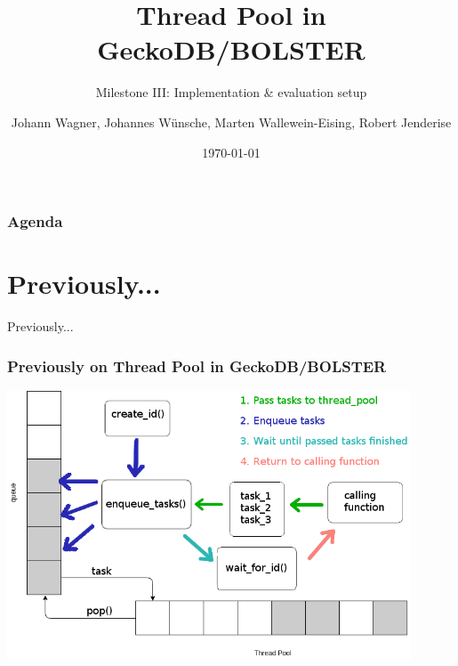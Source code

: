 \documentclass{beamer}
\title{Thread Pool in GeckoDB/BOLSTER}
\subtitle{Milestone III: Implementation \& evaluation setup}
\author{Johann Wagner, Johannes Wünsche, Marten Wallewein-Eising, Robert Jenderise}
\date{\today}
\institute{Otto von Guericke University, Magdeburg}
\begin{document}
\begin{frame}[plain]
 \titlepage
\end{frame}

\section[Agenda]{}
	\begin{frame}
	\frametitle{Agenda}
	\tableofcontents
	\end{frame}

\section{Previously...}
\begin{frame}
	\begin{center}
		\huge Previously...
	\end{center}
\end{frame}

\begin{frame}
	\frametitle{Previously on Thread Pool in GeckoDB/BOLSTER}
	\begin{center}
		\includegraphics[width=0.9\textwidth]{img/pool_queue.png}
	\end{center}
\end{frame}
\end{document}
